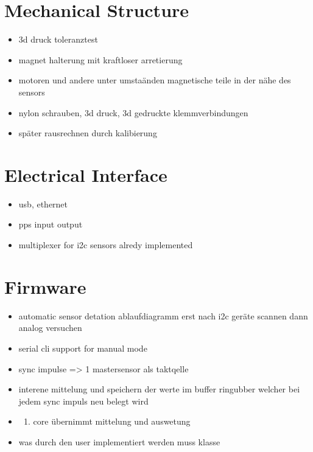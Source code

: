 \hypertarget{mechanical-structure}{%
\section{Mechanical Structure}\label{mechanical-structure}}

\begin{itemize}
\tightlist
\item
  3d druck toleranztest
\item
  magnet halterung mit kraftloser arretierung
\item
  motoren und andere unter umstaänden magnetische teile in der nähe des
  sensors
\item
  nylon schrauben, 3d druck, 3d gedruckte klemmverbindungen
\item
  später rausrechnen durch kalibierung
\end{itemize}

\hypertarget{electrical-interface}{%
\section{Electrical Interface}\label{electrical-interface}}

\begin{itemize}
\tightlist
\item
  usb, ethernet
\item
  pps input output
\item
  multiplexer for i2c sensors alredy implemented
\end{itemize}

\hypertarget{firmware}{%
\section{Firmware}\label{firmware}}

\begin{itemize}
\item
  automatic sensor detation ablaufdiagramm erst nach i2c geräte scannen
  dann analog versuchen
\item
  serial cli support for manual mode
\item
  sync impulse =\textgreater{} 1 mastersensor als taktqelle
\item
  interene mittelung und speichern der werte im buffer ringubber welcher
  bei jedem sync impuls neu belegt wird
\item
  \begin{enumerate}
  \def\labelenumi{\arabic{enumi}.}
  \setcounter{enumi}{1}
  \tightlist
  \item
    core übernimmt mittelung und auswetung
  \end{enumerate}
\item
  was durch den user implementiert werden muss klasse
\end{itemize}

